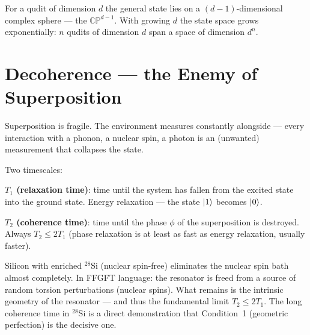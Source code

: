 For a qudit of dimension $d$ the general state lies on a
$(d-1)$-dimensional complex sphere --- the \textbf{$\mathbb{CP}^{d-1}$}.
With growing $d$ the state space grows
exponentially: $n$ qudits of dimension $d$
span a space of dimension $d^n$.

\section{Decoherence --- the Enemy of Superposition}
\label{sec:decoherence}

Superposition is fragile. The environment measures constantly
alongside --- every interaction with a phonon,
a nuclear spin, a photon is an
(unwanted) measurement that collapses the state.

Two timescales:

\textbf{$T_1$ (relaxation time)}: time until the system
has fallen from the excited state into the ground state.
Energy relaxation --- the state $\left|1\right\rangle$ becomes $\left|0\right\rangle$.

\textbf{$T_2$ (coherence time)}: time until the phase $\phi$
of the superposition is destroyed.
Always $T_2 \leq 2T_1$ (phase relaxation is at least
as fast as energy relaxation, usually faster).

\begin{center}
\end{center}

\begin{keyresult}
Silicon with enriched $^{28}$Si (nuclear spin-free)
eliminates the nuclear spin bath almost completely.
In FFGFT language: the resonator is freed from a
source of random torsion perturbations (nuclear spins).
What remains is the intrinsic
geometry of the resonator --- and thus
the fundamental limit $T_2 \leq 2T_1$.
The long coherence time in $^{28}$Si is a
direct demonstration that Condition~1
(geometric perfection) is the decisive one.
\end{keyresult}

